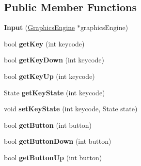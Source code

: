 \subsection*{Public Member Functions}
\begin{DoxyCompactItemize}
\item 
\mbox{\label{classTarbora_1_1Input_a55a9e2f2a9975190ba1a4988a160b565}} 
{\bfseries Input} (\hyperlink{classTarbora_1_1GraphicsEngine}{Graphics\+Engine} $\ast$graphics\+Engine)
\item 
\mbox{\label{classTarbora_1_1Input_ac6a1c81cb6cd595c416249d4487a8435}} 
bool {\bfseries get\+Key} (int keycode)
\item 
\mbox{\label{classTarbora_1_1Input_a69f64f63c65110a9ee1ba2c3cda9a51b}} 
bool {\bfseries get\+Key\+Down} (int keycode)
\item 
\mbox{\label{classTarbora_1_1Input_a5cb01354fffe3ffde262870965e4f1ab}} 
bool {\bfseries get\+Key\+Up} (int keycode)
\item 
\mbox{\label{classTarbora_1_1Input_a1f563b437cf29d3d690fae48a5f58d2f}} 
State {\bfseries get\+Key\+State} (int keycode)
\item 
\mbox{\label{classTarbora_1_1Input_a01201a11a22db928da24da9aea7c2c43}} 
void {\bfseries set\+Key\+State} (int keycode, State state)
\item 
\mbox{\label{classTarbora_1_1Input_af000902d489f55f74d3fd207cbb6098a}} 
bool {\bfseries get\+Button} (int button)
\item 
\mbox{\label{classTarbora_1_1Input_a98a069825636b97e00e78cfb56023b3e}} 
bool {\bfseries get\+Button\+Down} (int button)
\item 
\mbox{\label{classTarbora_1_1Input_a46ec433c57de113534709f0da77b75a8}} 
bool {\bfseries get\+Button\+Up} (int button)
\item 
\mbox{\label{classTarbora_1_1Input_a19310257065fe20b019474ae783ed8e5}} 

\end{DoxyCompactItemize}
